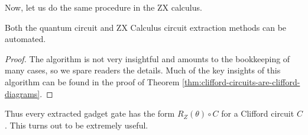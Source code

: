 Now, let us do the same procedure in the ZX calculus. 

\begin{example}

\end{example}

\begin{theorem}
Both the quantum circuit and ZX Calculus circuit extraction methods can be automated.
\end{theorem}

\begin{proof}
The algorithm is not very insightful and amounts to the bookkeeping of many cases, so we spare readers the details. Much of the key insights of this algorithm can be found in the proof of Theorem \ref{thm:clifford-circuits-are-clifford-diagrams}.
\end{proof}

Thus every extracted gadget gate has the form 
\(R_Z(\theta)\circ C\) for a Clifford circuit \(C\). This turns out to be extremely useful.